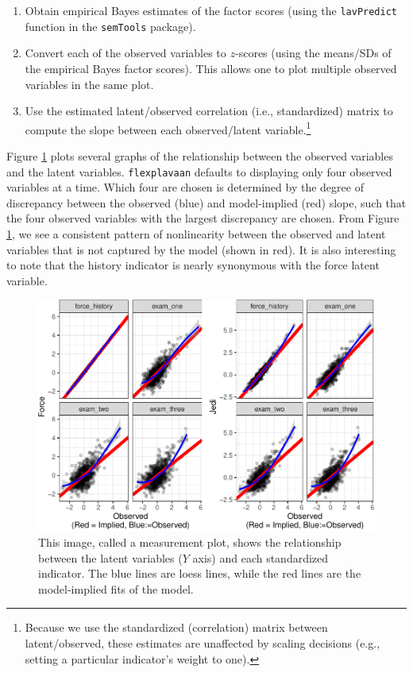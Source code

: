 \documentclass[
  english,
  man]{apa6}
\providecommand{\tightlist}{%
  \setlength{\itemsep}{0pt}\setlength{\parskip}{0pt}}
\begin{document}
\begin{enumerate}
\def\labelenumi{\arabic{enumi}.}
\tightlist
\item
  Obtain empirical Bayes estimates of the factor scores (using the \texttt{lavPredict} function in the \texttt{semTools} package).
\item
  Convert each of the observed variables to \(z\)-scores (using the means/SDs of the empirical Bayes factor scores). This allows one to plot multiple observed variables in the same plot.
\item
  Use the estimated latent/observed correlation (i.e., standardized) matrix to compute the slope between each observed/latent variable.\footnote{Because we use the standardized (correlation) matrix between latent/observed, these estimates are unaffected by scaling decisions (e.g., setting a particular indicator's weight to one).}
\end{enumerate}

Figure \ref{fig:measurementplot} plots several graphs of the relationship between the observed variables and the latent variables. \texttt{flexplavaan} defaults to displaying only four observed variables at a time. Which four are chosen is determined by the degree of discrepancy between the observed (blue) and model-implied (red) slope, such that the four observed variables with the largest discrepancy are chosen. From Figure \ref{fig:measurementplot}, we see a consistent pattern of nonlinearity between the observed and latent variables that is not captured by the model (shown in red). It is also interesting to note that the history indicator is nearly synonymous with the force latent variable.

\begin{figure}

{\centering \includegraphics[width=0.9\linewidth]{flexplavaan_draft_files/figure-latex/measurementplot-1} 

}

\caption{This image, called a measurement plot, shows the relationship between the latent variables ($Y$ axis) and each standardized indicator. The blue lines are loess lines, while the red lines are the model-implied fits of the model.}\label{fig:measurementplot}
\end{figure}
\end{document}

